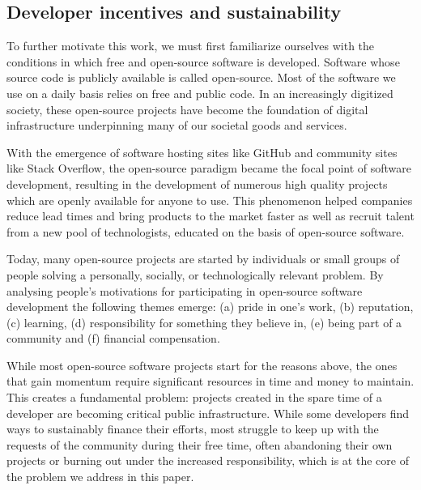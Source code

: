 \subsection{Developer incentives and sustainability}
\label{s:incentives}

To further motivate this work, we must first familiarize ourselves with the
conditions in which free and open-source software is developed. Software whose
source code is publicly available is called open-source. Most of the software
we use on a daily basis relies on free and public code. In an increasingly
digitized society, these open-source projects have become the foundation of
digital infrastructure underpinning many of our societal goods and services.

With the emergence of software hosting sites like GitHub and community sites
like Stack Overflow, the open-source paradigm became the focal point of
software development, resulting in the development of numerous high quality
projects which are openly available for anyone to use. This phenomenon helped
companies reduce lead times and bring products to the market faster as well as
recruit talent from a new pool of technologists, educated on the basis of
open-source software.

Today, many open-source projects are started by individuals or small groups of
people solving a personally, socially, or technologically relevant problem. By
analysing people's motivations for participating in open-source software
development the following themes emerge: (a) pride in one's work, (b)
reputation, (c) learning, (d) responsibility for something they believe in, (e)
being part of a community and (f) financial compensation.

While most open-source software projects start for the reasons above, the ones
that gain momentum require significant resources in time and money to maintain.
This creates a fundamental problem: projects created in the spare time of a
developer are becoming critical public infrastructure. While some developers
find ways to sustainably finance their efforts, most struggle to keep up with
the requests of the community during their free time, often abandoning their
own projects or burning out under the increased responsibility,  which is at
the core of the problem we address in this paper.


